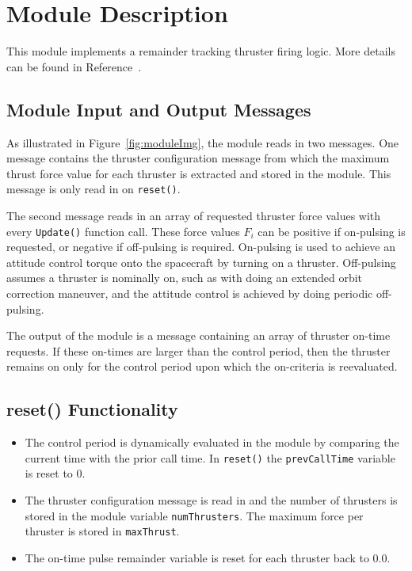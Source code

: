 


\section{Module Description}
This module implements a remainder tracking thruster firing logic.  More details can be found in Reference~.

\subsection{Module Input and Output Messages}
As illustrated in Figure~\ref{fig:moduleImg}, the module reads in two messages.  One message contains the thruster configuration message from which the maximum thrust force value for each thruster is extracted and stored in the module.  This message is only read in on {\tt reset()}.

The second message reads in an array of requested thruster force values with every {\tt Update()} function call.  These force values $F_{i}$ can be positive if on-pulsing is requested, or negative if off-pulsing is required.  On-pulsing is used to achieve an attitude control torque onto the spacecraft by turning on a thruster.  Off-pulsing assumes a thruster is nominally on, such as with doing an extended orbit correction maneuver, and the attitude control is achieved by doing periodic off-pulsing.

The output of the module is a message containing an array of thruster on-time requests.  If these on-times are larger than the control period, then the thruster remains on only for the control period upon which the on-criteria is reevaluated.


\subsection{reset() Functionality}
\begin{itemize}
	\item The control period is dynamically evaluated in the module by comparing the current time with the prior call time.  In {\tt reset()} the {\tt prevCallTime} variable is reset to 0.
	\item The thruster configuration message is read in and the number of thrusters is stored in the module variable {\tt numThrusters}.  The maximum force per thruster is stored in {\tt maxThrust}.
	\item The on-time pulse remainder variable is reset for each thruster back to 0.0.
\end{itemize}

